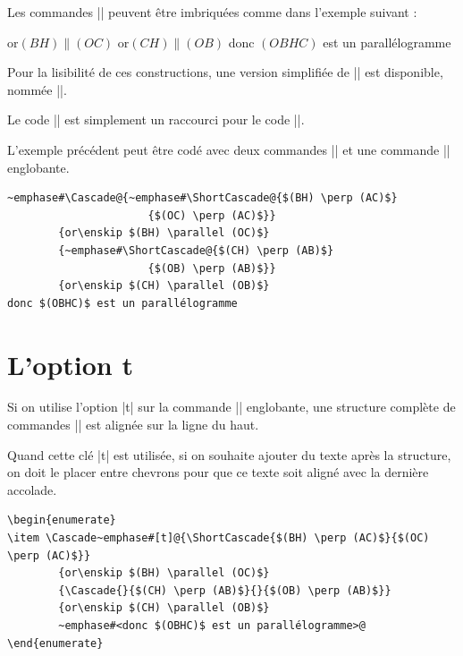 \documentclass[dvipsnames]{article}%
\def\interitem{\vspace{7mm plus 2 mm minus 3mm}}
\begin{document}
\interitem
Les commandes |\Cascade| peuvent être imbriquées comme dans l'exemple suivant :
\begin{center}
        {or\enskip $(BH) \parallel (OC)$}
        {}
        {or\enskip $(CH) \parallel (OB)$}
donc $(OBHC)$ est un parallélogramme
\end{center}

\interitem
Pour la lisibilité de ces constructions, une version simplifiée de |\Cascade|
est disponible, nommée |\ShortCascade|.  


Le code || est simplement un raccourci pour le code
||.

\medskip
L'exemple précédent peut être codé avec deux commandes |\ShortCascade|
et une commande |\Cascade| englobante.
\begin{Verbatim}
~emphase#\Cascade@{~emphase#\ShortCascade@{$(BH) \perp (AC)$}
                      {$(OC) \perp (AC)$}}
        {or\enskip $(BH) \parallel (OC)$}
        {~emphase#\ShortCascade@{$(CH) \perp (AB)$}
                      {$(OB) \perp (AB)$}}
        {or\enskip $(CH) \parallel (OB)$}
donc $(OBHC)$ est un parallélogramme
\end{Verbatim}


\bigskip
\section{L'option t}

Si on utilise l'option |t| sur la commande |\Cascade| englobante, une structure
complète de commandes |\Cascade| est alignée sur la ligne du haut.

Quand cette clé |t| est utilisée, si on souhaite ajouter du texte après la
structure, on doit le placer entre chevrons pour que ce texte soit aligné avec
la dernière accolade.


\begin{Verbatim}
\begin{enumerate}
\item \Cascade~emphase#[t]@{\ShortCascade{$(BH) \perp (AC)$}{$(OC) \perp (AC)$}}
        {or\enskip $(BH) \parallel (OC)$}
        {\Cascade{}{$(CH) \perp (AB)$}{}{$(OB) \perp (AB)$}}
        {or\enskip $(CH) \parallel (OB)$}
        ~emphase#<donc $(OBHC)$ est un parallélogramme>@
\end{enumerate}
\end{Verbatim}
\end{document}
